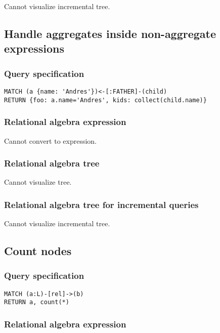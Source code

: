 Cannot visualize incremental tree.

\subsection{Handle aggregates inside non-aggregate expressions}

\subsubsection*{Query specification}

\begin{lstlisting}
MATCH (a {name: 'Andres'})<-[:FATHER]-(child)
RETURN {foo: a.name='Andres', kids: collect(child.name)}
\end{lstlisting}

\subsubsection*{Relational algebra expression}

Cannot convert to expression.

\subsubsection*{Relational algebra tree}

Cannot visualize tree.

\subsubsection*{Relational algebra tree for incremental queries}

Cannot visualize incremental tree.

\subsection{Count nodes}

\subsubsection*{Query specification}

\begin{lstlisting}
MATCH (a:L)-[rel]->(b)
RETURN a, count(*)
\end{lstlisting}

\subsubsection*{Relational algebra expression}


